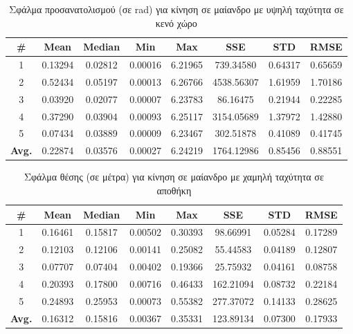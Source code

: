 \begin{table}[H]
    \centering
    \caption{Σφάλμα προσανατολισμού (σε rad) για κίνηση σε μαίανδρο με υψηλή ταχύτητα σε κενό χώρο}
    \label{tab:orientation_error_meander_fast_box}
    \begin{tabular}{| c | c | c | c | c | c | c | c | }
        \hline
        \rowcolor{Gray}
        \# & Mean & Median & Min & Max & SSE & STD & RMSE \\
        \hline
        1 & 0.13294 & 0.02812 & 0.00016 & 6.21965 & 739.34580 & 0.64317 & 0.65659 \\
        2 & 0.52434 & 0.05197 & 0.00013 & 6.26766 & 4538.56307 & 1.61959 & 1.70186 \\
        3 & 0.03920 & 0.02077 & 0.00007 & 6.23783 & 86.16475 & 0.21944 & 0.22285 \\
        4 & 0.37290 & 0.03904 & 0.00093 & 6.25117 & 3154.05689 & 1.37972 & 1.42880 \\
        5 & 0.07434 & 0.03889 & 0.00009 & 6.23467 & 302.51878 & 0.41089 & 0.41745 \\
        \hline
        \textbf{Avg.} & 0.22874 & 0.03576 & 0.00027 & 6.24219 & 1764.12986 & 0.85456 & 0.88551 \\
        \hline
    \end{tabular}
\end{table}

\begin{table}[H]
    \begin{center}
        \centering
        \caption{Σφάλμα θέσης (σε μέτρα) για κίνηση σε μαίανδρο με χαμηλή ταχύτητα σε αποθήκη}
        \label{tab:position_error_meander_slow_warehouse}
        \begin{tabular}{| c | c | c | c | c | c | c | c | }
        \hline
        \rowcolor{Gray}
        \# & Mean & Median & Min & Max & SSE & STD & RMSE \\
        \hline
        1 & 0.16461 & 0.15817 & 0.00502 & 0.30393 & 98.66991 & 0.05284 & 0.17289 \\
        2 & 0.12103 & 0.12106 & 0.00141 & 0.25082 & 55.44583 & 0.04189 & 0.12807 \\
        3 & 0.07707 & 0.07404 & 0.00402 & 0.19366 & 25.75932 & 0.04161 & 0.08758 \\
        4 & 0.20393 & 0.17800 & 0.00716 & 0.46433 & 162.21094 & 0.08732 & 0.22184 \\
        5 & 0.24893 & 0.25953 & 0.00073 & 0.55382 & 277.37072 & 0.14133 & 0.28625 \\
        \hline
        \textbf{Avg.} & 0.16312 & 0.15816 & 0.00367 & 0.35331 & 123.89134 & 0.07300 & 0.17933 \\
        \hline
        \end{tabular}
    \end{center}
\end{table}

